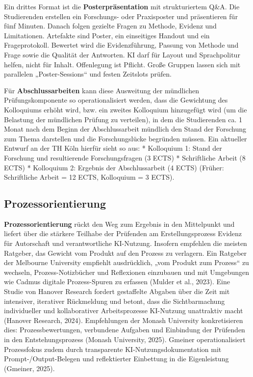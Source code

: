 \documentclass[
  ngerman,
  letterpaper,
  DIV=11]{scrreprt}
\begin{document}
Ein drittes Format ist die \textbf{Posterpräsentation} mit
strukturiertem Q\&A. Die Studierenden erstellen ein Forschungs- oder
Praxisposter und präsentieren für fünf Minuten. Danach folgen gezielte
Fragen zu Methode, Evidenz und Limitationen. Artefakte sind Poster, ein
einseitiges Handout und ein Frageprotokoll. Bewertet wird die
Evidenzführung, Passung von Methode und Frage sowie die Qualität der
Antworten. KI darf für Layout und Sprachpolitur helfen, nicht für
Inhalt. Offenlegung ist Pflicht. Große Gruppen lassen sich mit
parallelen „Poster-Sessions`` und festen Zeitslots prüfen.

Für \textbf{Abschlussarbeiten} kann diese Ausweitung der mündlichen
Prüfungskomponente so operationalisiert werden, dass die Gewichtung des
Kolloquiums erhöht wird, bzw. ein zweites Kolloquium hinzugefügt wird
(um die Belastung der mündlichen Prüfung zu verteilen), in dem die
Studierenden ca. 1 Monat nach dem Beginn der Abschlussarbeit mündlich
den Stand der Forschung zum Thema darstellen und die Forschungslücke
begründen müssen. Ein aktueller Entwurf an der TH Köln hierfür sieht so
aus: * Kolloquium 1: Stand der Forschung und resultierende
Forschungsfragen (3 ECTS) * Schriftliche Arbeit (8 ECTS) * Kolloquium 2:
Ergebnis der Abschlussarbeit (4 ECTS) (Früher: Schriftliche Arbeit = 12
ECTS, Kolloquium = 3 ECTS).

\subsection{Prozessorientierung}\label{prozessorientierung}

\textbf{Prozessorientierung} rückt den Weg zum Ergebnis in den
Mittelpunkt und liefert über die stärkere Teilhabe der Prüfenden am
Erstellungsprozess Evidenz für Autorschaft und verantwortliche
KI-Nutzung. Insofern empfehlen die meisten Ratgeber, das Gewicht vom
Produkt auf den Prozess zu verlagern. Ein Ratgeber der Melbourne
University empfiehlt ausdrücklich, „vom Produkt zum Prozess`` zu
wechseln, Prozess-Notizbücher und Reflexionen einzubauen und mit
Umgebungen wie Cadmus digitale Prozess-Spuren zu erfassen (Mulder et
al., 2023). Eine Studie von Hanover Research fordert gestaffelte Abgaben
über die Zeit mit intensiver, iterativer Rückmeldung und betont, dass
die Sichtbarmachung individueller und kollaborativer Arbeitsprozesse
KI-Nutzung unattraktiv macht (Hanover Research, 2024). Empfehlungen der
Monash University konkretisieren dies: Prozessbewertungen, verbundene
Aufgaben und Einbindung der Prüfenden in den Entstehungsprozess (Monash
University, 2025). Gmeiner operationalisiert Prozessfokus zudem durch
transparente KI-Nutzungsdokumentation mit Prompt-/Output-Belegen und
reflektierter Einbettung in die Eigenleistung (Gmeiner, 2025).
\end{document}
